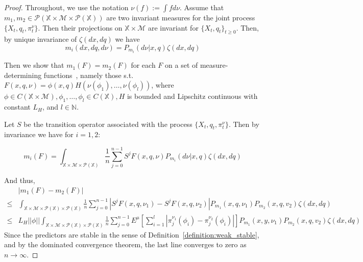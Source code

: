 \documentclass{article}
\begin{document}
\begin{proof}
    Throughout, we use the notation \( \nu(f) := \int fd\nu \). Assume that \( m_1,m_2 \in \mathcal{P}(\mathbb{X} \times \mathcal{M} \times \mathcal{P}(\mathbb{X})) \) are two invariant measures for the joint process \( \{X_t,q_t,\pi_t^\nu \} \). Then their projections on \( \mathbb{X} \times \mathcal{M} \) are invariant for \( \{X_t, q_t\}_{t\ge0} \). Then, by unique invariance of \( \zeta(dx,dq) \) we have
    \[ m_i(dx,dq,d\nu) = P_{m_i}(d\nu | x,q)\zeta(dx,dq) \]

    Then we show that \( m_1(F) = m_2(F) \) for each \( F \) on a set of measure-determining functions~\cite{Stettner}, namely those s.t. \( F(x,q,\nu) = \phi(x,q)H(\nu(\phi_1),\ldots,\nu(\phi_l)) \), where \( \phi \in C(\mathbb{X} \times \mathcal{M}), \phi_1,\ldots,\phi_l \in C(\mathbb{X}), H \) is bounded and Lipschitz continuous with constant \( L_H \), and \( l \in \mathbb{N} \).

    Let \( S \) be the transition operator associated with the process \( \{X_t,q_t,\pi_t^\nu \} \). Then by invariance we have for \( i=1,2 \):

    \[ m_i(F) =  \int_{\mathbb{X} \times \mathcal{M} \times \mathcal{P}(\mathbb{X})} \frac{1}{n}\sum_{j=0}^{n-1}S^j F(x,q,\nu)P_{m_i}(d\nu | x,q)\zeta(dx,dq) \]

    And thus,
    \begin{align*}
            & |m_1(F) - m_2(F)|                                                                                                                                                                                                                                             \\
        \le & \int_{\mathbb{X} \times \mathcal{M} \times \mathcal{P}(\mathbb{X}) \times \mathcal{P}(\mathbb{X})} \frac{1}{n}\sum_{j=0}^{n-1} |S^j F(x,q,\nu_1) - S^j F(x,q,\nu_2)|P_{m_1}(x,q,\nu_1)P_{m_2}(x,q,v_2)\zeta(dx,dq)                                            \\
        \le & L_H ||\phi|| \int_{\mathbb{X} \times \mathcal{M} \times \mathcal{P}(\mathbb{X}) \times \mathcal{P}(\mathbb{X})} \frac{1}{n}\sum_{j=0}^{n-1}E^\mu[\sum_{i=1}^{l}|\pi_j^{\nu_1}(\phi_i) - \pi_j^{\nu_2}(\phi_i)|]P_{m_1}(x,y,\nu_1)P_{m_2}(x,q,v_2)\zeta(dx,dq)
    \end{align*}
    Since the predictors are stable in the sense of Definition~\ref{definition:weak_stable}, and by the dominated convergence theorem, the last line converges to zero as \( n \to \infty \).
\end{proof}
\end{document}
